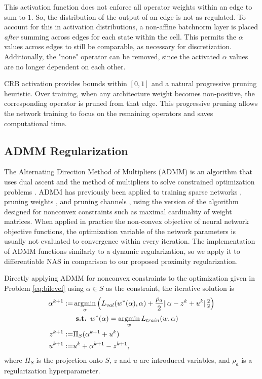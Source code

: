 \documentclass[letterpaper]{article} \usepackage{aaai22}  \usepackage{times}  \usepackage{helvet}  \usepackage{courier}  \usepackage[hyphens]{url}  \usepackage{graphicx} \urlstyle{rm} \def\UrlFont{\rm}  \usepackage{natbib}  \usepackage{caption} \DeclareCaptionStyle{ruled}{labelfont=normalfont,labelsep=colon,strut=off} \frenchspacing  \setlength{\pdfpagewidth}{8.5in}  \setlength{\pdfpageheight}{11in}  \usepackage{algorithm}
\DeclareMathOperator*{\argmin}{argmin}
\DeclarePairedDelimiter{\norm}{\lVert}{\rVert}
\begin{document}
\iffalse
\begin{wrapfigure}{r}{1.6in}
\texttt{[image: images/clamp.png]}
\caption{Clipped ReLU} \label{img:clamp}
\end{wrapfigure}
\fi

This activation function does not enforce all operator weights within an edge to sum to $1$. So, the distribution of the output of an edge is not as regulated. To account for this in activation distributions, a non-affine batchnorm layer is placed \textit{after} summing across edges for each state within the cell. This permits the $\alpha$ values across edges to still be comparable, as necessary for discretization. Additionally, the "none" operator can be removed, since the activated $\alpha$ values are no longer dependent on each other.

CRB activation provides bounds within $[0,1]$ and a natural progressive pruning heuristic. Over training, when any architecture weight becomes non-positive, the corresponding operator is pruned from that edge. This progressive pruning allows the network training to focus on the remaining operators and saves computational time.

\subsection{ADMM Regularization}
The Alternating Direction Method of Multipliers (ADMM) is an algorithm that uses dual ascent and the method of multipliers to solve constrained optimization problems \cite{boyd2010}. ADMM has previously been applied to training sparse networks \cite{kiaee2016alternating}, pruning weights \cite{zhang2018structadmm,ye2018progressive}, and pruning channels \cite{ma2019}, using the version of the algorithm designed for nonconvex constraints such as maximal cardinality of weight matrices. When applied in practice the non-convex objective of neural network objective functions, the optimization variable of the network parameters is usually not evaluated to convergence within every iteration. The implementation of ADMM functions similarly to a dynamic regularization, so we apply it to differentiable NAS in comparison to our proposed proximity regularization.

Directly applying ADMM for nonconvex constraints \cite{boyd2010} to the optimization given in Problem \ref{eq:bilevel} using $\alpha \in S$ as the constraint, the iterative solution is
\begin{align}
    \alpha^{k+1} := & \argmin_\alpha\Big(L_{val}(w^*(\alpha),\alpha)+\frac{\rho_{a}}2\norm{\alpha-z^k+u^k}_2^2\Big) \label{eq:admma}\\
    &\textbf{ s.t. } w^*(\alpha) = \argmin_w L_{train}(w,\alpha) \label{eq:admmw}\\
    z^{k+1} := &\Pi_S(\alpha^{k+1}+u^k) \\
    u^{k+1} := &u^k+\alpha^{k+1} - z^{k+1}, \label{eq:u}
\end{align}
where $\Pi_S$ is the projection onto $S$, $z$ and $u$ are introduced variables, and $\rho_{a}$ is a regularization hyperparameter.
\end{document}
